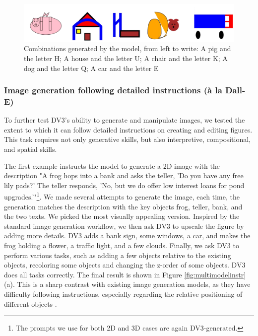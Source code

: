 \begin{figure}[ht]
	\centering
	\includegraphics[width=1\textwidth]{Section 2/letters_objects.png}
	\caption{Combinations generated by the model, from left to write: A pig and the letter H; A house and the letter U; A chair and the letter K; A dog and the letter Q; A car and the letter E}
	\label{fig:objectletterimg}
\end{figure}

\subsubsection{Image generation following detailed instructions (\`a la Dall-E)}
To further test DV3's ability to generate and manipulate images, we tested the extent to which it can follow detailed instructions on creating and editing figures. This task requires not only generative skills, but also interpretive, compositional, and spatial skills. 

The first example instructs the model to generate a 2D image with the description "A frog hops into a bank and asks the teller, 'Do you have any free lily pads?' The teller responds, 'No, but we do offer low interest loans for pond upgrades.'"\footnote{The prompts we use for both 2D and 3D cases are again DV3-generated.}. We made several attempts to generate the image, each time, the generation matches the description with the key objects frog, teller, bank, and the two texts. We picked the most visually appealing version. Inspired by the standard image generation workflow, we then ask DV3 to upscale the figure by adding more details. DV3 adds a bank sign, some windows, a car, and makes the frog holding a flower, a traffic light, and a few clouds. Finally, we ask DV3 to perform various tasks, such as adding a few objects relative to the existing objects, recoloring some objects and changing the z-order of some objects. DV3 does all tasks correctly. The final result is shown in Figure \ref{fig:multimodelinstr} (a). This is a sharp contrast with existing image generation models, as they have difficulty following instructions, especially regarding the relative positioning of different objects \cite{edit}.

